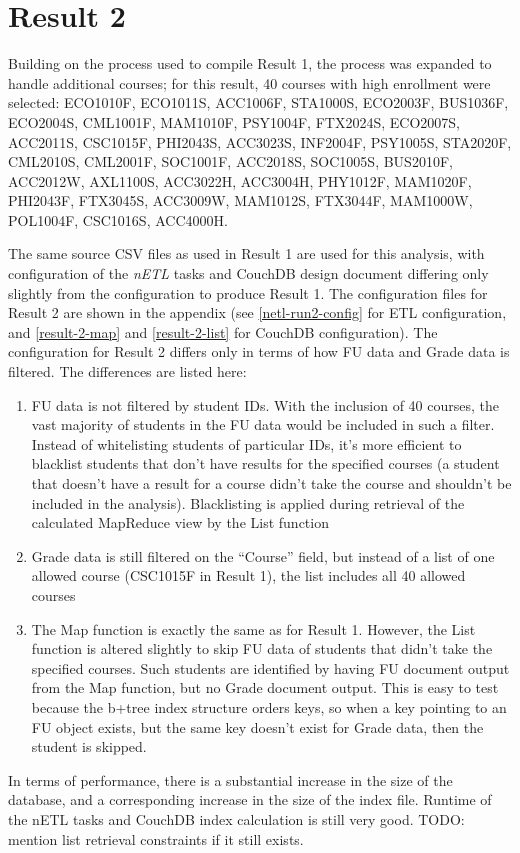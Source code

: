 \section{Result 2}
Building on the process used to compile Result 1, the process was expanded to handle additional courses; for this result, 40 courses with high enrollment were selected: ECO1010F, ECO1011S, ACC1006F, STA1000S, ECO2003F, BUS1036F, ECO2004S, CML1001F, MAM1010F, PSY1004F, FTX2024S, ECO2007S, ACC2011S, CSC1015F, PHI2043S, ACC3023S, INF2004F, PSY1005S, STA2020F, CML2010S, CML2001F, SOC1001F, ACC2018S, SOC1005S, BUS2010F, ACC2012W, AXL1100S, ACC3022H, ACC3004H, PHY1012F, MAM1020F, PHI2043F, FTX3045S, ACC3009W, MAM1012S, FTX3044F, MAM1000W, POL1004F, CSC1016S, ACC4000H.

The same source CSV files as used in Result 1 are used for this analysis, with configuration of the \textit{nETL} tasks and CouchDB design document differing only slightly from the configuration to produce Result 1. The configuration files for Result 2 are shown in the appendix (see \ref{netl-run2-config} for ETL configuration, and \ref{result-2-map} and \ref{result-2-list} for CouchDB configuration). The configuration for Result 2 differs only in terms of how FU data and Grade data is filtered. The differences are listed here:

\begin{enumerate}
    \item FU data is not filtered by student IDs. With the inclusion of 40 courses, the vast majority of students in the FU data would be included in such a filter. Instead of whitelisting students of particular IDs, it's more efficient to blacklist students that don't have results for the specified courses (a student that doesn't have a result for a course didn't take the course and shouldn't be included in the analysis). Blacklisting is applied during retrieval of the calculated MapReduce view by the List function
    \item Grade data is still filtered on the ``Course'' field, but instead of a list of one allowed course (CSC1015F in Result 1), the list includes all 40 allowed courses
    \item The Map function is exactly the same as for Result 1. However, the List function is altered slightly to skip FU data of students that didn't take the specified courses. Such students are identified by having FU document output from the Map function, but no Grade document output. This is easy to test because the b+tree index structure orders keys, so when a key pointing to an FU object exists, but the same key doesn't exist for Grade data, then the student is skipped.
\end{enumerate}

In terms of performance, there is a substantial increase in the size of the database, and a corresponding increase in the size of the index file. Runtime of the nETL tasks and CouchDB index calculation is still very good. TODO: mention list retrieval constraints if it still exists.